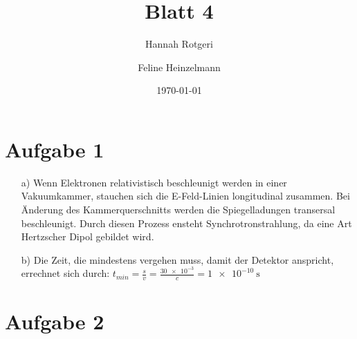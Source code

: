 \documentclass[11pt,a4paper]{article}
\title{Blatt 4}
\date{\today}
\author{Hannah Rotgeri \and Feline Heinzelmann}
\begin{document}
    \maketitle

    \section*{Aufgabe 1}
	\begin{itemize}
		\item[a)]
			Wenn Elektronen relativistisch beschleunigt werden in einer Vakuumkammer, stauchen sich die E-Feld-Linien longitudinal zusammen. 
			Bei Änderung des Kammerquerschnitts werden die Spiegelladungen transersal beschleunigt. Durch diesen Prozess ensteht Synchrotronstrahlung, da eine Art Hertzscher Dipol gebildet wird.
		\item[b)]
			Die Zeit, die mindestens vergehen muss, damit der Detektor anspricht, errechnet sich durch: 
				$t_{min} = \frac{s}{v} = \frac{\num{30e-3}}{c} = \SI{1e-10}{\second}$
	\end{itemize}


	
    \section*{Aufgabe 2}
\end{document}
